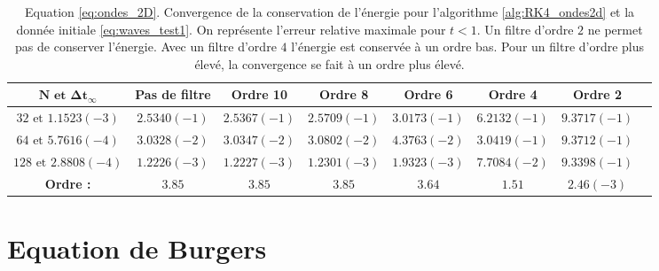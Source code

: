 \begin{table}[htbp]
\begin{center}
\begin{tabular}{|c||c|c|c|c|c|c|c|}
\hline
$\mathbf{N \text{ et } \Delta t_{\infty}}$ & \textbf{Pas de filtre} & \textbf{Ordre 10} & \textbf{Ordre 8} & \textbf{Ordre 6} & \textbf{Ordre 4} & \textbf{Ordre 2}\\
\hline
$32\text{ et }1.1523(-3)$ & $2.5340(-1)$ & $2.5367(-1)$ & $2.5709(-1)$ & $3.0173(-1)$ & $6.2132(-1)$ & $9.3717(-1)$ \\
\hline
$64\text{ et }5.7616(-4)$ & $3.0328(-2)$ & $3.0347(-2)$ & $3.0802(-2)$ & $4.3763(-2)$ & $3.0419(-1)$ & $9.3712(-1)$ \\
\hline
$128\text{ et }2.8808(-4)$& $1.2226(-3)$ & $1.2227(-3)$ & $1.2301(-3)$ & $1.9323(-3)$ & $7.7084(-2)$ & $9.3398(-1)$ \\
\hline
\hline
\textbf{Ordre :} & $3.85$ & $3.85$ & $3.85$ & $3.64$ & $1.51$ & $2.46(-3)$ \\
\hline 
\end{tabular}
\end{center}
\caption{Equation \eqref{eq:ondes_2D}. Convergence de la conservation de l'énergie pour l'algorithme \ref{alg:RK4_ondes2d} et la donnée initiale \eqref{eq:waves_test1}. On représente l'erreur relative maximale pour $t<1$. Un filtre d'ordre $2$ ne permet pas de conserver l'énergie. Avec un filtre d'ordre $4$ l'énergie est conservée à un ordre bas. Pour un filtre d'ordre plus élevé, la convergence se fait à un ordre plus élevé.}
\label{tab:conservation_waves}
\end{table} 






























\section{Equation de Burgers}

